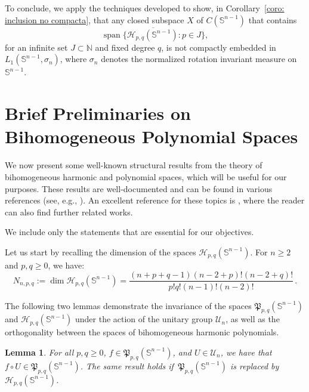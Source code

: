 \documentclass[12pt]{amsart}
\numberwithin{subsection}{section}
\newtheorem{lemma}[theorem]{Lemma}
\theoremstyle{definition}
\theoremstyle{remark}
\begin{document}
To conclude, we apply the techniques developed to show, in Corollary~\ref{coro: inclusion no compacta}, that any closed subspace $ X $
of $ C(\mathbb{S}^{n-1}) $ that contains
\[
\overline{\operatorname{span}\big\{ \mathcal{H}_{p,q}(\mathbb{S}^{n-1}) : p \in J \big\}},
\]
for an infinite set $ J \subset \mathbb{N} $ and fixed degree $ q $, is not compactly embedded in $ L_1(\mathbb{S}^{n-1}, \sigma_n) $,
where $ \sigma_n $ denotes the normalized rotation invariant measure on  $ \mathbb{S}^{n-1} $.



\section{Brief Preliminaries on Bihomogeneous Polynomial Spaces}

We now present some well-known structural results from the theory of bihomogeneous harmonic and polynomial spaces, which will be useful
for our purposes. These results are well-documented and can be found in various references (see, e.g., \cite{dunkl_xu_2001,folland1975spherical,rudin1980}). An excellent reference for these topics is \cite{klima2004subelliptic}, where the reader can also find further related works.

We include only the statements that are essential for our objectives.

Let us start by recalling the dimension of the spaces  $ \mathcal{H}_{p,q}(\mathbb{S}^{n-1})$. For $n \geq 2$ and  $p, q \geq 0$, we have:
\begin{equation} \label{dimfor-comp}
N_{n,p,q} := \dim \mathcal{H}_{p,q}(\mathbb{S}^{n-1})
= \frac{(n + p + q - 1)(n - 2 + p)! (n - 2 + q)!}{p! q! (n - 1)! (n - 2)!}\,.
\end{equation}


The following two lemmas demonstrate the invariance of the spaces $ \mathfrak{P}_{p,q}(\mathbb{S}^{n-1}) $ and $ \mathcal{H}_{p,q}(\mathbb{S}^{n-1})$
under the action of the unitary group $ \mathcal{U}_n $, as well as the orthogonality between the spaces of bihomogeneous harmonic polynomials.

\smallskip

\begin{lemma} \label{lemma: invariance}
For all $ p, q \geq 0 $, $ f \in \mathfrak{P}_{p,q}(\mathbb{S}^{n-1}) $, and $ U \in \mathcal{U}_n $, we have that $ f \circ U \in \mathfrak{P}_{p,q}(\mathbb{S}^{n-1}) $. The same result holds if\,
$\mathfrak{P}_{p,q}(\mathbb{S}^{n-1}) $  is replaced by $ \mathcal{H}_{p,q}(\mathbb{S}^{n-1}) $.
\end{lemma}
\end{document}
